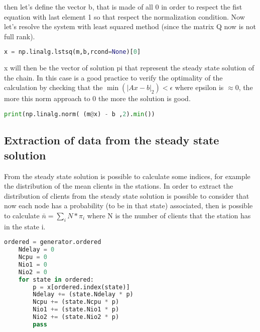 \documentclass[12pt,a4paper]{article}
\begin{document}
then let's define the vector b, that is made of all 0 in order to respect the fist equation with last element 1 so that respect the normalization condition. Now let's resolve the system with least squared method (since the matrix Q now is not full rank).

\begin{lstlisting}[language=python]
    x = np.linalg.lstsq(m,b,rcond=None)[0]
\end{lstlisting}

x will then be the vector of solution pi that represent the steady state solution of the chain. In this case is a good practice to verify the optimality of the calculation by checking that the $\min(|Ax-b|_2 )< \epsilon$ where epsilon is $\approx 0$, the more this norm approach to 0 the more the solution is good.

\begin{lstlisting}[language = python]
    print(np.linalg.norm( (m@x) - b ,2).min())
\end{lstlisting}
\subsection{Extraction of data from the steady state solution}

From the steady state solution is possible to calculate some indices, for example the distribution of the mean clients in the stations. In order to extract the distribution of clients from the steady state solution is possible to consider that now each node has a probability (to be in that state) associated, then is possible to calculate $\bar{n}=\sum_{i}N * \pi_i$ where N is the number of clients that the station has in the state i.

\begin{lstlisting}[language=python]
    ordered = generator.ordered
    Ndelay = 0
    Ncpu = 0
    Nio1 = 0
    Nio2 = 0
    for state in ordered:
        p = x[ordered.index(state)]
        Ndelay += (state.Ndelay * p)
        Ncpu += (state.Ncpu * p)
        Nio1 += (state.Nio1 * p)
        Nio2 += (state.Nio2 * p)
        pass
\end{lstlisting}
\end{document}
